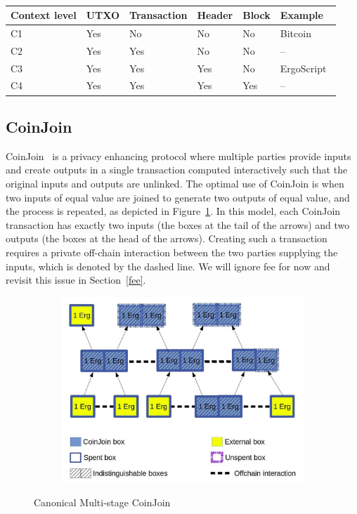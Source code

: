 \documentclass[runningheads]{llncs}
\newcommand{\langname}{ErgoScript\xspace}
\begin{document}
~\\
\begin{tabular}{|l|l|l|l|l|l|}\hline
	Context level & UTXO & Transaction & Header      & Block & Example \\ \hline
	 C1     & Yes  & No          & No  		   & No    & Bitcoin~\cite{Nak08} \\
	 C2     & Yes & Yes         & No 		   & No    & -- \\
	 C3     & Yes & Yes         & Yes 		   & No    & \langname ~\cite{ergo}   \\
	 C4     & Yes & Yes         & Yes 		   & Yes   & --    \\\hline
\end{tabular}

\subsection{CoinJoin} 
\label{coinjoin}
CoinJoin~\cite{coinjoin} is a privacy enhancing protocol where multiple parties provide inputs and create outputs in a single transaction computed interactively such that the original inputs and outputs are unlinked. The optimal use of CoinJoin is when two inputs of equal value are joined to generate two outputs of equal value, and the process is repeated, as depicted in Figure~\ref{fig:coinjoin}. 
In this model, each CoinJoin transaction has exactly two inputs (the boxes at the tail of the arrows) and two outputs (the boxes at the head of the arrows). Creating such a transaction requires a private off-chain interaction between the two parties supplying the inputs, which is denoted by the dashed line. We will ignore fee for now and revisit this issue in Section~\ref{fee}.

\begin{figure}
	\centering
	\begin{subfigure}{.6\textwidth}
		\centering
		\includegraphics[width=\linewidth]{CoinJoin.jpg}
	\end{subfigure}%
	\caption{Canonical Multi-stage CoinJoin}
	\label{fig:coinjoin}
\end{figure}
\end{document}
